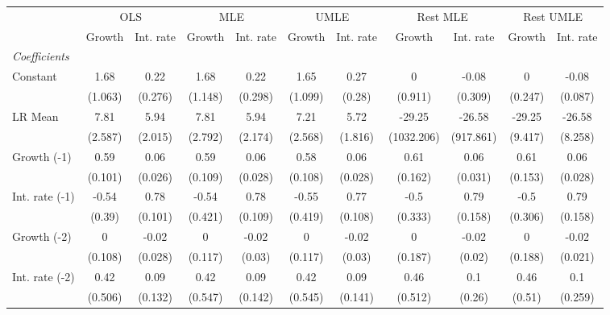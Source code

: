 \begin{table}[htbp] 
	\centering
	\begin{tabular}{@{\extracolsep{4pt}}lcccccccccc@{}}		\hline\hline
		 		 & \multicolumn{2}{c}{OLS} &\multicolumn{2}{c}{MLE} &\multicolumn{2}{c}{UMLE} &\multicolumn{2}{c}{Rest MLE} &\multicolumn{2}{c}{Rest UMLE} \\ 
 		 & Growth 	 & Int. rate 	 & Growth 	 & Int. rate 	 & Growth 	 & Int. rate 	 & Growth 	 & Int. rate 	 & Growth 	 & Int. rate\\\cline{2-3}\cline{4-5}\cline{6-7}\cline{8-9}\cline{10-11}
\rule{0pt}{4ex} 
 \emph{Coefficients} 	  		 & 		 & 		 & 		 & 		 & 		 & 		 & 		 & 		 & 		 &\\ 
\quad Constant 	 & 1.68 	 & 0.22 	 & 1.68 	 & 0.22 	 & 1.65 	 & 0.27 	 & 0 	 & -0.08 	 & 0 	 & -0.08	 \\ 
 		 & (1.063) 	 & (0.276) 	 & (1.148) 	 & (0.298) 	 & (1.099) 	 & (0.28) 	 & (0.911) 	 & (0.309) 	 & (0.247) 	 & (0.087) 	 \\ 
\quad LR Mean 	 & 7.81 	 & 5.94 	 & 7.81 	 & 5.94 	 & 7.21 	 & 5.72 	 & -29.25 	 & -26.58 	 & -29.25 	 & -26.58	 \\ 
 		 & (2.587) 	 & (2.015) 	 & (2.792) 	 & (2.174) 	 & (2.568) 	 & (1.816) 	 & (1032.206) 	 & (917.861) 	 & (9.417) 	 & (8.258) 	 \\ 
\quad Growth (-1) 	 &0.59 	 & 0.06 	 & 0.59 	 & 0.06 	 & 0.58 	 & 0.06 	 & 0.61 	 & 0.06 	 & 0.61 	 & 0.06	 \\ 
 		 & (0.101) 	 & (0.026) 	 & (0.109) 	 & (0.028) 	 & (0.108) 	 & (0.028) 	 & (0.162) 	 & (0.031) 	 & (0.153) 	 & (0.028) 	 \\ 
\quad Int. rate (-1) 	 &-0.54 	 & 0.78 	 & -0.54 	 & 0.78 	 & -0.55 	 & 0.77 	 & -0.5 	 & 0.79 	 & -0.5 	 & 0.79	 \\ 
 		 & (0.39) 	 & (0.101) 	 & (0.421) 	 & (0.109) 	 & (0.419) 	 & (0.108) 	 & (0.333) 	 & (0.158) 	 & (0.306) 	 & (0.158) 	 \\ 
\quad Growth (-2) 	 &0 	 & -0.02 	 & 0 	 & -0.02 	 & 0 	 & -0.02 	 & 0 	 & -0.02 	 & 0 	 & -0.02	 \\ 
 		 & (0.108) 	 & (0.028) 	 & (0.117) 	 & (0.03) 	 & (0.117) 	 & (0.03) 	 & (0.187) 	 & (0.02) 	 & (0.188) 	 & (0.021) 	 \\ 
\quad Int. rate (-2) 	 &0.42 	 & 0.09 	 & 0.42 	 & 0.09 	 & 0.42 	 & 0.09 	 & 0.46 	 & 0.1 	 & 0.46 	 & 0.1	 \\ 
 		 & (0.506) 	 & (0.132) 	 & (0.547) 	 & (0.142) 	 & (0.545) 	 & (0.141) 	 & (0.512) 	 & (0.26) 	 & (0.51) 	 & (0.259) 	 \\ 

\end{tabular}
\end{table}
